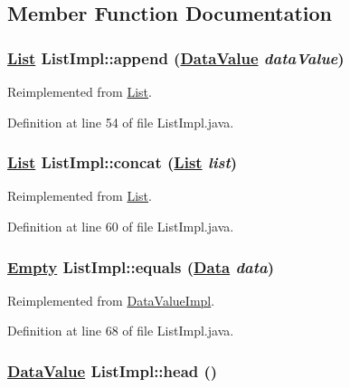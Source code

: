 \subsection{Member Function Documentation}
\hypertarget{classListImpl_a3}{
\subsubsection[append]{\setlength{\rightskip}{0pt plus 5cm}\hyperlink{interfaceList}{List} List\-Impl::append (\hyperlink{interfaceDataValue}{Data\-Value} {\em data\-Value})}}
\label{classListImpl_a3}




Reimplemented from \hyperlink{interfaceList_a3}{List}.

Definition at line 54 of file List\-Impl.java.\hypertarget{classListImpl_a4}{
\subsubsection[concat]{\setlength{\rightskip}{0pt plus 5cm}\hyperlink{interfaceList}{List} List\-Impl::concat (\hyperlink{interfaceList}{List} {\em list})}}
\label{classListImpl_a4}




Reimplemented from \hyperlink{interfaceList_a4}{List}.

Definition at line 60 of file List\-Impl.java.\hypertarget{classListImpl_a5}{
\subsubsection[equals]{\setlength{\rightskip}{0pt plus 5cm}\hyperlink{interfaceEmpty}{Empty} List\-Impl::equals (\hyperlink{interfaceData}{Data} {\em data})}}
\label{classListImpl_a5}




Reimplemented from \hyperlink{classDataValueImpl_a5}{Data\-Value\-Impl}.

Definition at line 68 of file List\-Impl.java.\hypertarget{classListImpl_a0}{
\subsubsection[head]{\setlength{\rightskip}{0pt plus 5cm}\hyperlink{interfaceDataValue}{Data\-Value} List\-Impl::head ()}}
\label{classListImpl_a0}




